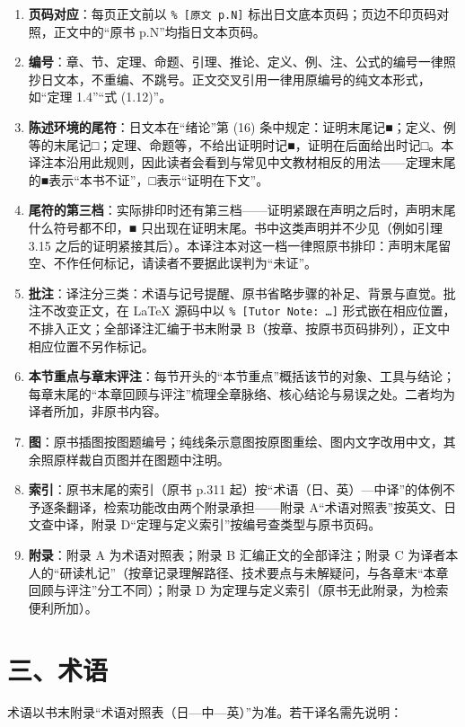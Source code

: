 \begin{enumerate}[leftmargin=2.2em,itemsep=2pt]
\item \textbf{页码对应}：每页正文前以 \verb|% [原文 p.N]| 标出日文底本页码；页边不印页码对照，正文中的“原书 p.N”均指日文本页码。
\item \textbf{编号}：章、节、定理、命题、引理、推论、定义、例、注、公式的编号一律照抄日文本，不重编、不跳号。正文交叉引用一律用原编号的纯文本形式，如“定理 1.4”“式 (1.12)”。
\item \textbf{陈述环境的尾符}：日文本在“绪论”第 (16) 条中规定：证明末尾记■；定义、例等的末尾记□；定理、命题等，不给出证明时记■，证明在后面给出时记□。本译注本沿用此规则，因此读者会看到与常见中文教材相反的用法——定理末尾的■表示“本书不证”，□表示“证明在下文”。
\item \textbf{尾符的第三档}：实际排印时还有第三档——证明紧跟在声明之后时，声明末尾什么符号都不印，■ 只出现在证明末尾。书中这类声明并不少见（例如引理 3.15 之后的证明紧接其后）。本译注本对这一档一律照原书排印：声明末尾留空、不作任何标记，请读者不要据此误判为“未证”。
\item \textbf{批注}：译注分三类：术语与记号提醒、原书省略步骤的补足、背景与直觉。批注不改变正文，在 LaTeX 源码中以 \verb|% [Tutor Note: …]| 形式嵌在相应位置，不排入正文；全部译注汇编于书末附录 B（按章、按原书页码排列），正文中相应位置不另作标记。
\item \textbf{本节重点与章末评注}：每节开头的“本节重点”概括该节的对象、工具与结论；每章末尾的“本章回顾与评注”梳理全章脉络、核心结论与易误之处。二者均为译者所加，非原书内容。
\item \textbf{图}：原书插图按图题编号；纯线条示意图按原图重绘、图内文字改用中文，其余照原样裁自页图并在图题中注明。
\item \textbf{索引}：原书末尾的索引（原书 p.311 起）按“术语（日、英）—中译”的体例不予逐条翻译，检索功能改由两个附录承担——附录 A“术语对照表”按英文、日文查中译，附录 D“定理与定义索引”按编号查类型与原书页码。
\item \textbf{附录}：附录 A 为术语对照表；附录 B 汇编正文的全部译注；附录 C 为译者本人的“研读札记”（按章记录理解路径、技术要点与未解疑问，与各章末“本章回顾与评注”分工不同）；附录 D 为定理与定义索引（原书无此附录，为检索便利所加）。
\end{enumerate}

\section*{三、术语}

术语以书末附录“术语对照表（日—中—英）”为准。若干译名需先说明：

